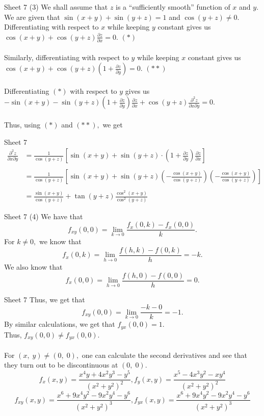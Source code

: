 \documentclass[handout, aspectratio=169]{beamer}
\begin{document}
\begin{frame}{Sheet 7}
	(3) We shall assume that $z$ is a ``sufficiently smooth'' function of $x$ and $y.$\\
	We are given that $\sin (x+y)+\sin (y+z)=1$ and $\cos (y+z) \neq 0.$\\ 
	Differentiating with respect to $x$ while keeping $y$ constant gives us $\cos (x+y)+\cos (y+z) \frac{\partial z}{\partial x}=0.$ \hfill $(*)$\\~\\
	Similarly, differentiating with respect to $y$ while keeping $x$ constant gives us $\cos (x+y)+\cos (y+z)\left(1+\frac{\partial z}{\partial y}\right)=0.$ \hfill $(**)$\\~\\
	Differentiating $(*)$ with respect to $y$ gives us $-\sin (x+y)-\sin (y+z)\left(1+\frac{\partial z}{\partial y}\right) \frac{\partial z}{\partial x}+\cos (y+z) \frac{\partial^{2} z}{\partial x \partial y}=0.$\\~\\
	Thus, using $(*)$ and $(**),$ we get
\end{frame}
\begin{frame}{Sheet 7}
	\begin{align*} \frac{\partial^{2} z}{\partial x \partial y} &=\frac{1}{\cos (y+z)}\left[\sin (x+y)+\sin (y+z) \cdot\left(1+\frac{\partial z}{\partial y}\right) \frac{\partial z}{\partial x}\right] \\~\\ &=\frac{1}{\cos (y+z)}\left[\sin (x+y)+\sin (y+z)\left(-\frac{\cos (x+y)}{\cos (y+z)}\right)\left(-\frac{\cos (x+y)}{\cos (y+z)}\right)\right] \\~\\ &=\frac{\sin (x+y)}{\cos (y+z)}+\tan (y+z) \frac{\cos ^{2}(x+y)}{\cos ^{2}(y+z)} \end{align*}
\end{frame}

\begin{frame}{Sheet 7}
	(4) We have that
	\[f_{x y}(0,0)=\lim _{k \rightarrow 0} \frac{f_{x}(0, k)-f_{x}(0,0)}{k}.\]
	For $k \neq 0,$ we know that
	\[f_{x}(0, k)=\lim _{h \rightarrow 0} \frac{f(h, k)-f(0, k)}{h}=-k.\]
	We also know that 
	\[f_{x}(0,0)=\lim _{h \rightarrow 0} \frac{f(h, 0)-f(0,0)}{h}=0.\]
\end{frame}

\begin{frame}{Sheet 7}
	Thus, we get that
	\[f_{x y}(0,0)=\lim _{k \rightarrow 0} \frac{-k-0}{k}=-1.\]
	By similar calculations, we get that $f_{y x}(0,0)=1.$\\
	Thus, $f_{x y}(0,0) \neq f_{y x}(0,0).$\\~\\
	For $(x,\;y) \neq (0,\;0),$ one can calculate the second derivatives and see that they turn out to be discontinuous at $(0,\;0).$
	\[{f_{x}(x, y)=\frac{x^{4} y+4 x^{2} y^{3}-y^{5}}{\left(x^{2}+y^{2}\right)^{2}}, f_{y}(x, y)=\frac{x^{5}-4 x^{3} y^{2}-x y^{4}}{\left(x^{2}+y^{2}\right)^{2}}} \]
	\[ {f_{xy}(x,y)=\frac{x^{6}+9 x^{4} y^{2}-9 x^{2} y^{4}-y^{6}}{\left(x^{2}+y^{2}\right)^{3}},f_{yx}(x, y)=\frac{x^{6}+9 x^{4} y^{2}-9 x^{2} y^{4}-y^{6}}{\left(x^{2}+y^{2}\right)^{3}}}\]
\end{frame}
\end{document}
